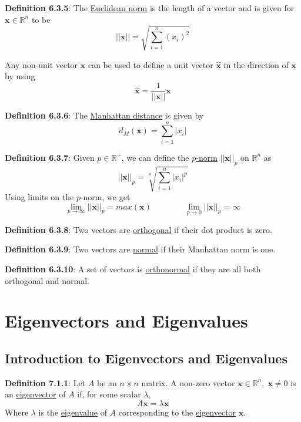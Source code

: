 \documentclass{article}
\newcommand{\separate}[1] {\vspace{#1 pt}\noindent}
\newcommand{\R}{\mathbb{R}}
\newcommand{\definition}[2]{\textbf{Definition #1}: #2\label{def:#1}}
\begin{document}
\separate{7}\definition{6.3.5}{The \underline{Euclidean norm} is the length of a vector and is given for \(\mathbf{x} \in \R^n\) to be
\begin{equation}
    ||\mathbf{x}|| = \sqrt{\sum_{i=1}^{n}(x_i)^2}
\end{equation}}

\newpage\noindent Any non-unit vector \(\mathbf{x}\) can be used to define a unit vector \(\mathbf{\hat{x}}\) in the direction of \(\mathbf{x}\) by using
\begin{equation}
    \mathbf{\hat{x}} = \frac{1}{||\mathbf{x}||}\mathbf{x}
\end{equation}

\separate{7}\definition{6.3.6}{The \underline{Manhattan distance} is given by}
\begin{equation}
    d_M(\mathbf{x}) = \sum_{i=1}^{n} |x_i|
\end{equation}

\separate{7}\definition{6.3.7}{Given \(p \in \R^+\), we can define the \underline{\(p\)-norm} \(||\mathbf{x}||_p\) on \(\R^n\) as
\begin{equation}
    ||\mathbf{x}||_p = \sqrt[p]{\sum_{i=1}^{n} |x_i|^p}
\end{equation}
Using limits on the \(p\)-norm, we get
\begin{equation}
    \lim_{p\rightarrow\infty}||\mathbf{x}||_p = max(\mathbf{x}) \qquad\qquad \lim_{p \rightarrow 0} ||\mathbf{x}||_p = \infty
\end{equation}}

\separate{7}\definition{6.3.8}{Two vectors are \underline{orthogonal} if their dot product is zero.}

\separate{7}\definition{6.3.9}{Two vectors are \underline{normal} if their Manhattan norm is one.}

\separate{7}\definition{6.3.10}{A set of vectors is \underline{orthonormal} if they are all both orthogonal and normal.}

\section{Eigenvectors and Eigenvalues}

\subsection{Introduction to Eigenvectors and Eigenvalues}

\definition{7.1.1}{Let \(A\) be an \(n \times n\) matrix. A non-zero vector \(\mathbf{x} \in \R^n,\;\mathbf{x} \neq 0\) is an \underline{eigenvector} of \(A\) if, for some scalar \(\lambda\),
\begin{equation}
    A\mathbf{x} = \lambda\mathbf{x}
\end{equation}
Where \(\lambda\) is the \underline{eigenvalue} of \(A\) corresponding to the \underline{eigenvector} \(\mathbf{x}\). }
\end{document}
